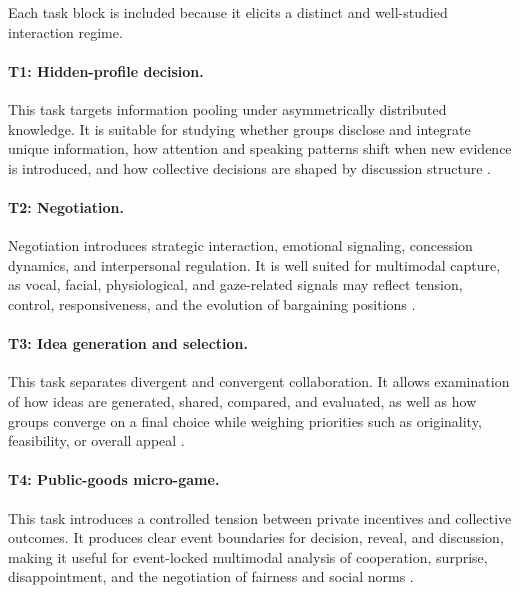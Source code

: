 \documentclass[runningheads]{llncs}
\begin{document}

\noindent Each task block is included because it elicits a distinct and well-studied interaction regime.

\vspace{-5pt}
\paragraph{T1: Hidden-profile decision.}
This task targets information pooling under asymmetrically distributed knowledge. It is suitable for studying whether groups disclose and integrate unique information, how attention and speaking patterns shift when new evidence is introduced, and how collective decisions are shaped by discussion structure \cite{stasser1985_hiddenprofile,lu2012_hiddenprofile_meta}.

\vspace{-5pt}
\paragraph{T2: Negotiation.}
Negotiation introduces strategic interaction, emotional signaling, concession dynamics, and interpersonal regulation. It is well suited for multimodal capture, as vocal, facial, physiological, and gaze-related signals may reflect tension, control, responsiveness, and the evolution of bargaining positions \cite{vankleef2004_emotion_negotiation}.

\vspace{-5pt}
\paragraph{T3: Idea generation and selection.}
This task separates divergent and convergent collaboration. It allows examination of how ideas are generated, shared, compared, and evaluated, as well as how groups converge on a final choice while weighing priorities such as originality, feasibility, or overall appeal \cite{rietzschel2010selection}.

\paragraph{T4: Public-goods micro-game.}
This task introduces a controlled tension between private incentives and collective outcomes. It produces clear event boundaries for decision, reveal, and discussion, making it useful for event-locked multimodal analysis of cooperation, surprise, disappointment, and the negotiation of fairness and social norms \cite{fehr2000_publicgoods_punishment,chaudhuri2011_publicgoods_survey}.
\end{document}
